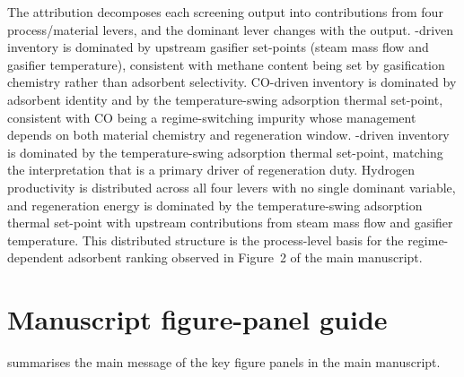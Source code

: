 \documentclass[11pt,a4paper]{article}
\newcommand{\COtwo}{\ce{CO2}}
\newcommand{\CHfour}{\ce{CH4}}
\newcommand{\TSA}{temperature-swing adsorption}
\begin{document}
The attribution decomposes each screening output into contributions from
four process/material levers, and the dominant lever changes with the
output. \CHfour-driven inventory is dominated by upstream gasifier
set-points (steam mass flow and gasifier temperature), consistent with
methane content being set by gasification chemistry rather than adsorbent
selectivity. CO-driven inventory is dominated by adsorbent identity and by
the \TSA{} thermal set-point, consistent with CO being a regime-switching
impurity whose management depends on both material chemistry and
regeneration window. \COtwo-driven inventory is dominated by the \TSA{}
thermal set-point, matching the interpretation that \COtwo{} is a primary driver of
regeneration duty. Hydrogen productivity is distributed across all four
levers with no single dominant variable, and regeneration energy is
dominated by the \TSA{} thermal set-point with upstream contributions from
steam mass flow and gasifier temperature. This distributed structure is
the process-level basis for the regime-dependent adsorbent ranking
observed in Figure~2 of the main manuscript.

\FloatBarrier
\section{Manuscript figure-panel guide}

 summarises the main message of the key figure panels
in the main manuscript.
\end{document}
